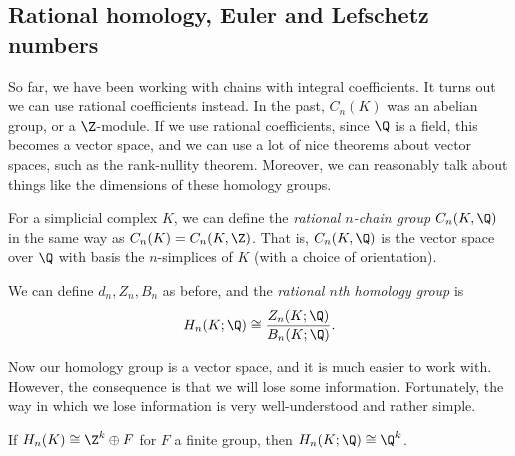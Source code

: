 \documentclass[a4paper]{article}
\begin{document}
\subsection{Rational homology, Euler and Lefschetz numbers}
So far, we have been working with chains with integral coefficients. It turns out we can use rational coefficients instead. In the past, $C_n(K)$ was an abelian group, or a $\Z$-module. If we use rational coefficients, since $\Q$ is a field, this becomes a vector space, and we can use a lot of nice theorems about vector spaces, such as the rank-nullity theorem. Moreover, we can reasonably talk about things like the dimensions of these homology groups.

\begin{defi}
  For a simplicial complex $K$, we can define the \emph{rational $n$-chain group} $C_n(K, \Q)$ in the same way as $C_n(K) = C_n(K, \Z)$. That is, $C_n(K, \Q)$ is the vector space over $\Q$ with basis the $n$-simplices of $K$ (with a choice of orientation).

  We can define $d_n, Z_n, B_n$ as before, and the \emph{rational $n$th homology group} is
  \[
    H_n(K; \Q) \cong \frac{Z_n(K; \Q)}{B_n(K; \Q)}.
  \]
\end{defi}
Now our homology group is a vector space, and it is much easier to work with. However, the consequence is that we will lose some information. Fortunately, the way in which we lose information is very well-understood and rather simple.

\begin{lemma}
  If $H_n(K) \cong \Z^k \oplus F$ for $F$ a finite group, then $H_n(K; \Q) \cong \Q^k$.
\end{lemma}
\end{document}
